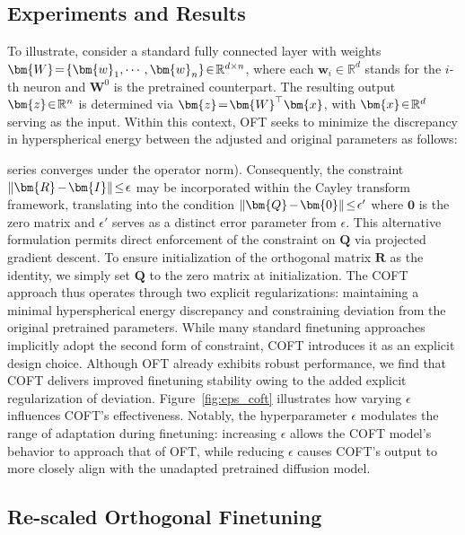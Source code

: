 \begin{itemize}[leftmargin=*,nosep]
\section{Experiments and Results}

To illustrate, consider a standard fully connected layer with weights $\thickmuskip=2mu \medmuskip=2mu \bm{W}=\{\bm{w}_1,\cdots,\bm{w}_n\}\in\mathbb{R}^{d\times n}$, where each $\bm{w}_i\in\mathbb{R}^{d}$ stands for the $i$-th neuron and $\bm{W}^0$ is the pretrained counterpart. The resulting output $\thickmuskip=2mu \medmuskip=2mu \bm{z}\in\mathbb{R}^n$ is determined via $\thickmuskip=2mu \medmuskip=2mu \bm{z}=\bm{W}^\top\bm{x}$, with $\thickmuskip=2mu \medmuskip=2mu \bm{x}\in\mathbb{R}^d$ serving as the input. Within this context, OFT seeks to minimize the discrepancy in hyperspherical energy between the adjusted and original parameters as follows:

series converges under the operator norm). Consequently, the constraint $\thickmuskip=2mu \medmuskip=2mu\|\bm{R}-\bm{I}\|\leq\epsilon$ may be incorporated within the Cayley transform framework, translating into the condition $\thickmuskip=2mu \medmuskip=2mu \|\bm{Q}-\bm{0}\|\leq\epsilon'$ where $\bm{0}$ is the zero matrix and $\epsilon'$ serves as a distinct error parameter from $\epsilon$. This alternative formulation permits direct enforcement of the constraint on $\bm{Q}$ via projected gradient descent. To ensure initialization of the orthogonal matrix $\bm{R}$ as the identity, we simply set $\bm{Q}$ to the zero matrix at initialization. The COFT approach thus operates through two explicit regularizations: maintaining a minimal hyperspherical energy discrepancy and constraining deviation from the original pretrained parameters. While many standard finetuning approaches implicitly adopt the second form of constraint, COFT introduces it as an explicit design choice. Although OFT already exhibits robust performance, we find that COFT delivers improved finetuning stability owing to the added explicit regularization of deviation. Figure~\ref{fig:eps_coft} illustrates how varying $\epsilon$ influences COFT’s effectiveness. Notably, the hyperparameter $\epsilon$ modulates the range of adaptation during finetuning: increasing $\epsilon$ allows the COFT model’s behavior to approach that of OFT, while reducing $\epsilon$ causes COFT's output to more closely align with the unadapted pretrained diffusion model.

\subsection{Re-scaled Orthogonal Finetuning}


\end{itemize}
